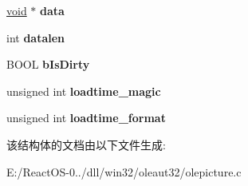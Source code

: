 \begin{DoxyCompactItemize}
\hyperlink{interfacevoid}{void} $\ast$ {\bfseries data}
\item 
\mbox{\label{struct_o_l_e_picture_impl_afbc0ed2fbced8794fc7d6c69d3c25546}} 
int {\bfseries datalen}
\item 
\mbox{\label{struct_o_l_e_picture_impl_abb2b6b0557b101fa33e19711aa3e3dbe}} 
B\+O\+OL {\bfseries b\+Is\+Dirty}
\item 
\mbox{\label{struct_o_l_e_picture_impl_a315fcfe60202ffe70a54273a64de42bb}} 
unsigned int {\bfseries loadtime\+\_\+magic}
\item 
\mbox{\label{struct_o_l_e_picture_impl_ad42ec0f84b9d7e63756e07360b721140}} 
unsigned int {\bfseries loadtime\+\_\+format}
\end{DoxyCompactItemize}


该结构体的文档由以下文件生成\+:\begin{DoxyCompactItemize}
\item 
E\+:/\+React\+O\+S-\/0../dll/win32/oleaut32/olepicture.\+c\end{DoxyCompactItemize}

